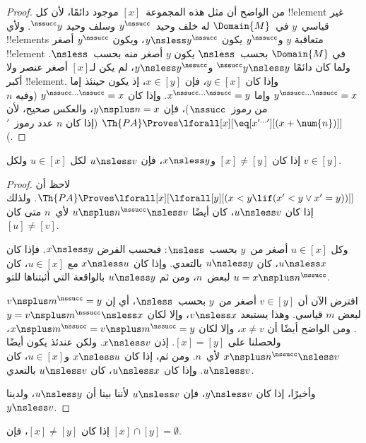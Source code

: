 \documentclass[../../../include/open-logic-section]{subfiles}
\begin{document}
\begin{proof}
من الواضح أن مثل هذه المجموعة~$[x]$ موجود دائمًا، لأن كل !!{element}
غير قياسي~$y$ في~$\Domain{M}$ له خلف وحيد~$y^\nssucc$ وسلف وحيد
$^\nssucc y$. ولأي !!{element}s متعاقبة $y$ و$y^\nssucc$ يكون
$y \nsless y^\nssucc$، ويكون $y^\nssucc$ أصغر !!{element} في
$\Domain{M}$ بحسب~$\nsless$ يكون $y$ أصغر منه بحسب~$\nsless$.
ولما كان دائمًا $^\nssucc y \nsless y$ و$y \nsless y^\nssucc$، لم
يكن لـ$[x]$ أصغر عنصر ولا أكبر !!{element}. وإذا كان
$y \in [x]$، فإن $x \in [y]$، إذ يكون حينئذ إما
$y^{\nssucc\dots\nssucc} = x$ وإما
$x^{\nssucc\dots\nssucc} = y$. وإذا كان
$y^{\nssucc\dots\nssucc} = x$ (وفيه $n$ من رموز~$\nssucc$)، فإن
$y \nsplus n = x$، والعكس صحيح، لأن
$\Th{PA} \Proves \lforall[x][\eq[x^{\prime\dots\prime}][(x +
    \num{n})]]$ (إذا كان $n$ عدد رموز~$\prime$).
\end{proof}

\begin{prop}
إذا كان $[x] \neq [y]$ و$x \nsless y$، فإن $u \nsless v$ لكل
$u \in [x]$ ولكل $v \in [y]$.
\end{prop}

\begin{proof}
لاحظ أن
$\Th{PA} \Proves \lforall[x][\lforall[y][(x < y \lif (x' < y
    \lor x' = y))]]$. ولذلك إذا كان $u \nsless v$، كان أيضًا
$u \nsplus n^\nssucc \nsless v$ لأي~$n$ متى كان $[u] \neq [v]$.

وكل $u \in [x]$ أصغر من~$y$ بحسب~$\nsless$: فبحسب الفرض
$x \nsless y$. فإذا كان $u \nsless x$، كان $u \nsless y$ بالتعدي.
وإذا كان $x \nsless u$ مع $u \in [x]$، كان
$u = x\nsplus n^\nssucc$ لبعض~$n$، ومن ثم $u \nsless y$ بالواقعة التي
أثبتناها للتو.

افترض الآن أن $v \in [y]$ أصغر من~$y$ بحسب~$\nsless$، أي إن
$v \nsplus m^\nssucc = y$ لبعض $m$ قياسي. وهذا يستبعد
$v \nsless x$، وإلا لكان $y = v \nsplus m^\nssucc \nsless x$.
ومن الواضح أيضًا أن $x \neq v$، وإلا لكان
$x \nsplus m^\nssucc = v \nsplus m^\nssucc = y$، ولحصلنا على
$[x] = [y]$. إذن $x \nsless v$. ولكن عندئذ يكون أيضًا
$x \nsplus n^\nssucc \nsless v$ لأي~$n$. ومن ثم، إذا كان
$x \nsless u$ و$u \in [x]$، كان $u \nsless v$. وإذا كان
$u \nsless x$، كان $u \nsless v$ بالتعدي.

وأخيرًا، إذا كان $y \nsless v$، فإن $u \nsless v$ لأننا بينا أن
$u \nsless y$، ولدينا $y \nsless v$.
\end{proof}

\begin{cor}
إذا كان $[x] \neq [y]$، فإن $[x] \cap [y] = \emptyset$.
\end{cor}
\end{document}
